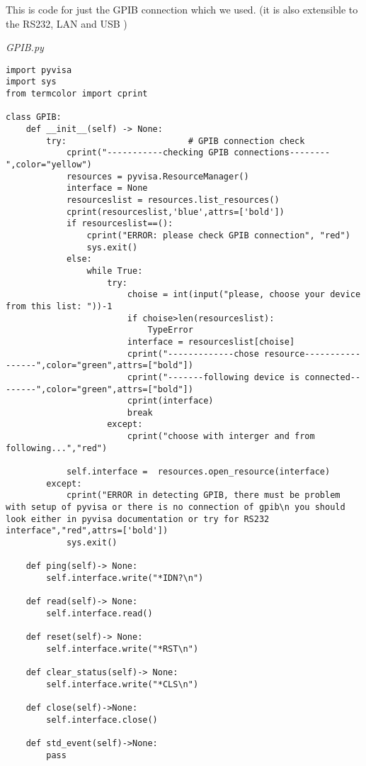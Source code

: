 \documentclass[12pt]{article}
\begin{document}
This is code for just the GPIB connection which we used. (it is also extensible to the RS232, LAN and USB )

\emph{GPIB.py}
\begin{verbatim}
import pyvisa
import sys
from termcolor import cprint

class GPIB:
    def __init__(self) -> None:                                 
        try:                        # GPIB connection check
            cprint("-----------checking GPIB connections--------",color="yellow")
            resources = pyvisa.ResourceManager()
            interface = None
            resourceslist = resources.list_resources()
            cprint(resourceslist,'blue',attrs=['bold'])
            if resourceslist==():
                cprint("ERROR: please check GPIB connection", "red")
                sys.exit()
            else:
                while True:
                    try:
                        choise = int(input("please, choose your device from this list: "))-1
                        if choise>len(resourceslist):
                            TypeError
                        interface = resourceslist[choise]
                        cprint("-------------chose resource-----------------",color="green",attrs=["bold"])
                        cprint("-------following device is connected--------",color="green",attrs=["bold"])
                        cprint(interface)
                        break
                    except:
                        cprint("choose with interger and from following...","red")

            self.interface =  resources.open_resource(interface)
        except:
            cprint("ERROR in detecting GPIB, there must be problem with setup of pyvisa or there is no connection of gpib\n you should look either in pyvisa documentation or try for RS232 interface","red",attrs=['bold'])
            sys.exit()

    def ping(self)-> None:
        self.interface.write("*IDN?\n")

    def read(self)-> None:
        self.interface.read()

    def reset(self)-> None:
        self.interface.write("*RST\n")

    def clear_status(self)-> None:
        self.interface.write("*CLS\n")

    def close(self)->None:
        self.interface.close()

    def std_event(self)->None:
        pass

\end{verbatim}
\end{document}

